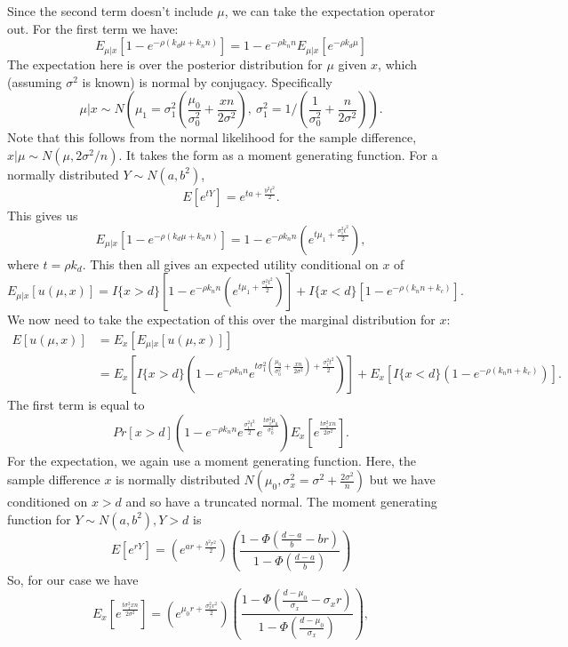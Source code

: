\documentclass[sagev]{sagej}
\begin{document}
Since the second term doesn't include $\mu$, we can take the expectation operator out. For the first term we have:
$$
E_{\mu | x}[1 - e^{-\rho(k_d\mu + k_n n)}] = 1 - e^{-\rho k_n n} E_{\mu | x}[e^{-\rho k_d \mu}]
$$
The expectation here is over the posterior distribution for $\mu$ given $x$, which (assuming $\sigma^2$ is known) is normal by conjugacy. Specifically
$$
\mu |x \sim N \left( \mu_1 = \sigma_1^2 \left( \frac{\mu_0}{\sigma_0^2} + \frac{xn}{2\sigma^2} \right), ~ \sigma_1^2 = 1/\left( \frac{1}{\sigma_0^2} + \frac{n}{2\sigma^2} \right) \right).
$$
Note that this follows from the normal likelihood for the sample difference, $x | \mu  \sim N(\mu, 2\sigma^2/n)$. It takes the form as a moment generating function. For a normally distributed $Y \sim N(a, b^2)$,
$$
E[e^{tY}] = e^{ta + \frac{b^2 t^2}{2}}.
$$
This gives us
$$
E_{\mu | x}[1 - e^{-\rho(k_d\mu + k_n n)}] = 1 - e^{-\rho k_n n} \left(e^{t\mu_1 + \frac{\sigma_1^2 t^2}{2}} \right),
$$
where $t = \rho k_d$. This then all gives an expected utility conditional on $x$ of
$$
E_{\mu | x} [u(\mu, x)] = I\{x > d\} \left[1 - e^{-\rho k_n n} \left(e^{t\mu_1 + \frac{\sigma_1^2 t^2}{2}} \right) \right] + I\{x < d\}\left[1 - e^{-\rho(k_n n + k_c)}\right].
$$
We now need to take the expectation of this over the marginal distribution for $x$:
$$
\begin{aligned}
E[u(\mu, x)] &= E_x\left[ E_{\mu | x} [u(\mu, x)] \right] \\
 &= E_x\left[ I\{x > d\} \left(1 - e^{-\rho k_n n} e^{t\sigma_1^2(\frac{\mu_0}{\sigma_0^2} + \frac{xn}{2\sigma^2}) + \frac{\sigma_1^2 t^2}{2}} \right) \right] + 
 E_x\left[ I\{x < d\}\left(1 - e^{-\rho(k_n n + k_c)}\right) \right].
\end{aligned}
$$
The first term is equal to
$$
Pr[x > d] \left( 1 - e^{-\rho k_n n} e^{\frac{\sigma_1^2 t^2}{2}} e^{\frac{t\sigma_1^2 \mu_0}{\sigma_0^2}}   \right) E_x \left[ e^{\frac{t\sigma_1^2 x n}{2\sigma^2}} \right].
$$
For the expectation, we again use a moment generating function. Here, the sample difference $x$ is normally distributed $N(\mu_0, \sigma_x^2 = \sigma^2 + \frac{2\sigma^2}{n})$ but we have conditioned on $x > d$ and so have a truncated normal. The moment generating function for $Y \sim N(a,b^2), Y > d$ is
$$
E[e^{rY}] =  \left( e^{ar + \frac{b^2 r^2}{2} } \right) \left(\frac{1 - \Phi(\frac{d-a}{b} - br)}{1 - \Phi(\frac{d-a}{b} )} \right)
$$
So, for our case we have
$$
 E_x \left[ e^{\frac{t\sigma_1^2 x n}{2\sigma^2}} \right] = \left( e^{\mu_0 r + \frac{\sigma_x^2 r^2}{2} } \right) \left(\frac{1 - \Phi(\frac{d-\mu_0}{\sigma_x} - \sigma_x r)}{1 - \Phi(\frac{d-\mu_0}{\sigma_x})} \right),
$$
\end{document}
